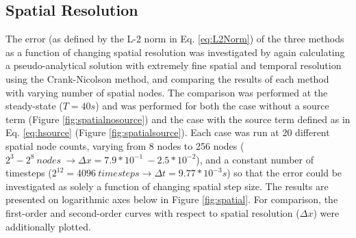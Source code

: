 \documentclass[10pt, letter, showtrims]{extarticle}
\begin{document}
		\pagebreak
		
		\subsection{Spatial Resolution}
		\label{sec:spatial}
		
		\noindent
		The error (as defined by the L-2 norm in Eq. \ref{eq:L2Norm}) of the three methods as a function of changing spatial resolution was investigated by again calculating a pseudo-analytical solution with extremely fine spatial and temporal resolution using the Crank-Nicolson method, and comparing the results of each method with varying number of spatial nodes. The comparison was performed at the steady-state ($T = 40 s$) and was performed for both the case without a source term (Figure \ref{fig:spatialnosource}) and the case with the source term defined as in Eq. \ref{eq:hsource} (Figure \ref{fig:spatialsource}). Each case was run at 20 different spatial node counts, varying from 8 nodes to 256 nodes ($2^{3} - 2^{8}\ nodes\ \rightarrow \Delta x = 7.9*10^{-1}\ - 2.5*10^{-2}$), and a constant number of timesteps ($2^{12} = 4096\ timesteps \rightarrow \Delta t = 9.77 * 10^{-3} s$) so that the error could be investigated as solely a function of changing spatial step size. The results are presented on logarithmic axes below in Figure \ref{fig:spatial}. For comparison, the first-order and second-order curves with respect to spatial resolution ($\Delta x$) were additionally plotted.
		
\end{document}
